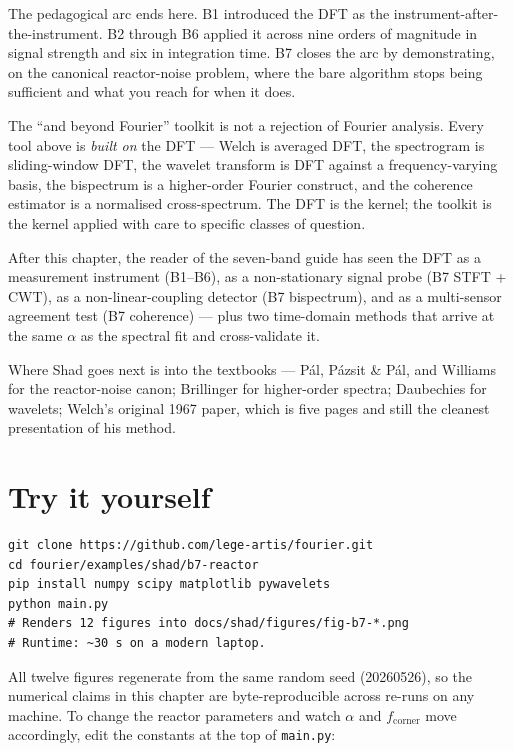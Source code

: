 \documentclass[11pt,a4paper,openany]{book}
\begin{document}
The pedagogical arc ends here. B1 introduced the DFT as the
instrument-after-the-instrument. B2 through B6 applied it across nine orders
of magnitude in signal strength and six in integration time. B7 closes the arc
by demonstrating, on the canonical reactor-noise problem, where the bare
algorithm stops being sufficient and what you reach for when it does.

The ``and beyond Fourier'' toolkit is not a rejection of Fourier analysis.
Every tool above is \emph{built on} the DFT --- Welch is averaged DFT, the
spectrogram is sliding-window DFT, the wavelet transform is DFT against a
frequency-varying basis, the bispectrum is a higher-order Fourier construct,
and the coherence estimator is a normalised cross-spectrum. The DFT is the
kernel; the toolkit is the kernel applied with care to specific classes of
question.

After this chapter, the reader of the seven-band guide has seen the DFT as a
measurement instrument (B1--B6), as a non-stationary signal probe (B7 STFT
+ CWT), as a non-linear-coupling detector (B7 bispectrum), and as a
multi-sensor agreement test (B7 coherence) --- plus two time-domain methods
that arrive at the same $\alpha$ as the spectral fit and cross-validate it.

Where Shad goes next is into the textbooks --- P\'{a}l, P\'{a}zsit \& P\'{a}l,
and Williams for the reactor-noise canon; Brillinger for higher-order spectra;
Daubechies for wavelets; Welch's original 1967 paper, which is five pages and
still the cleanest presentation of his method.

\section{Try it yourself}

\begin{lstlisting}[style=shaddata]
git clone https://github.com/lege-artis/fourier.git
cd fourier/examples/shad/b7-reactor
pip install numpy scipy matplotlib pywavelets
python main.py
# Renders 12 figures into docs/shad/figures/fig-b7-*.png
# Runtime: ~30 s on a modern laptop.
\end{lstlisting}

All twelve figures regenerate from the same random seed (20260526), so the
numerical claims in this chapter are byte-reproducible across re-runs on any
machine. To change the reactor parameters and watch $\alpha$ and
$f_\mathrm{corner}$ move accordingly, edit the constants at the top of
\texttt{main.py}:
\end{document}
